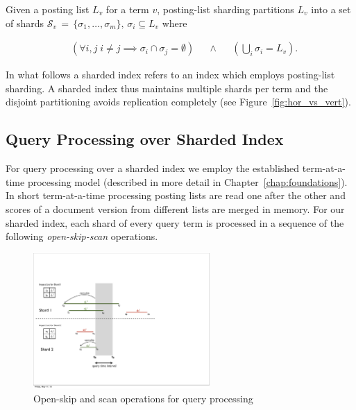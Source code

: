 \begin{definition}
Given a posting list $L_{v}$ for a term $v$, posting-list sharding partitions $L_{v}$ into a set of shards $\mathcal{S}_v \,=\, \{\sigma_1, \ldots, \sigma_{m}\}, \, \sigma_{i} \subseteq L_{v}$ where

\begin{equation*}
	\begin{aligned}
		& \left( \forall i,j \; i \neq j \implies \sigma_{i} \cap \sigma_{j} = \emptyset \right) 
		& & \wedge & 
		& \left( \bigcup_{i}{\sigma_i} =  L_{v} \right).  
	\end{aligned}
\end{equation*}

\end{definition}

In what follows a sharded index refers to an index which employs posting-list sharding. A sharded index thus maintains multiple shards per term and the disjoint partitioning avoids replication completely (see Figure~\ref{fig:hor_vs_vert}). 

\subsection{Query Processing over Sharded Index}

For query processing over a sharded index we employ the established term-at-a-time processing 
model (described in more detail in Chapter~\ref{chap:foundations}). In short term-at-a-time processing posting lists are read one after the other and scores of a document version from different lists are merged in memory. For our sharded index, each shard of every query term is processed in a sequence of the following \emph{open-skip-scan} operations.

\begin{figure}[tb]
	\centering
		\includegraphics[width=0.6\textwidth]{resources/qp_shards.pdf}
	\caption{Open-skip and scan operations for query processing}
	 \label{fig:open-skip-scan}
\end{figure}


